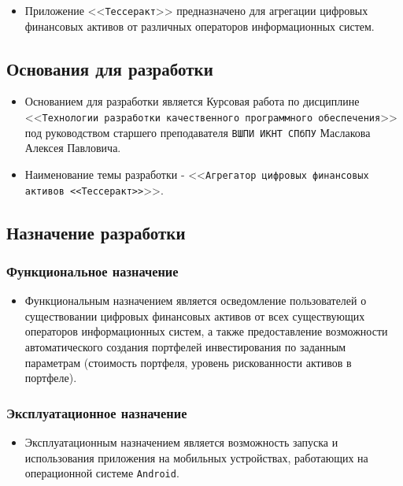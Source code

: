 \documentclass[a4paper, 14pt]{article}
\begin{document}
\begin{itemize}
    \item Приложение <<\texttt{Тессеракт}>> предназначено для агрегации цифровых финансовых активов от различных операторов информационных систем.
\end{itemize}

\subsection{Основания для разработки}

\begin{itemize}
    \item Основанием для разработки является Курсовая работа по дисциплине <<\texttt{Технологии разработки качественного программного обеспечения}>> под руководством старшего преподавателя \texttt{ВШПИ ИКНТ СПбПУ} Маслакова Алексея Павловича.
    \item Наименование темы разработки - <<\texttt{Агрегатор цифровых финансовых активов <<Тессеракт>>}>>.
\end{itemize}

\subsection{Назначение разработки}

\subsubsection{Функциональное назначение}

\begin{itemize}
    \item Функциональным назначением является осведомление пользователей о существовании цифровых финансовых активов от всех существующих операторов информационных систем, а также предоставление возможности автоматического создания портфелей инвестирования по заданным параметрам (стоимость портфеля, уровень рискованности активов в портфеле).
\end{itemize}

\subsubsection{Эксплуатационное назначение}

\begin{itemize}
    \item Эксплуатационным назначением является возможность запуска и использования приложения на мобильных устройствах, работающих на операционной системе \texttt{Android}.
\end{itemize}
\end{document}

